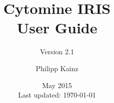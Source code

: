 \documentclass[
a4paper,
11pt,
oneside,
headsepline
]{scrbook}
\def\appVersion{2.1}
\begin{document}
\begin{titlepage}

\end{titlepage}

\frontmatter

\subject{Interobserver Reliability Study Module}
\title{Cytomine IRIS\\User Guide}
\subtitle{Version \appVersion}
\author{Philipp Kainz}
\date{May 2015\\{\small Last updated: \today}}
\maketitle


\newpage
{
\hypersetup{linkcolor=black}
\noptcrule
\doparttoc[n] 
\tableofcontents
}
\mainmatter



\end{document}
